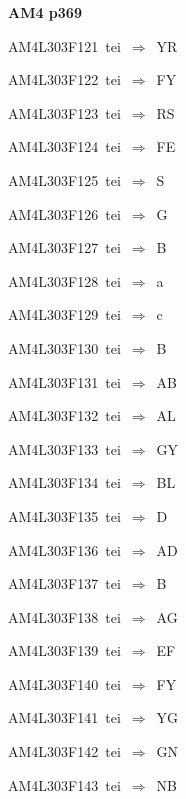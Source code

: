 \par\vfill\eject
{\bf\hfill AM4 p369\hfill\hbox{}}\par\bigskip
{\sixrm AM4L303F121\ {\sixit tei}\ }$\Rightarrow$\ YR\par\smallskip
{\sixrm AM4L303F122\ {\sixit tei}\ }$\Rightarrow$\ FY\par\smallskip
{\sixrm AM4L303F123\ {\sixit tei}\ }$\Rightarrow$\ RS\par\smallskip
{\sixrm AM4L303F124\ {\sixit tei}\ }$\Rightarrow$\ FE\par\smallskip
{\sixrm AM4L303F125\ {\sixit tei}\ }$\Rightarrow$\ S\par\smallskip
{\sixrm AM4L303F126\ {\sixit tei}\ }$\Rightarrow$\ G\par\smallskip
{\sixrm AM4L303F127\ {\sixit tei}\ }$\Rightarrow$\ B\par\smallskip
{\sixrm AM4L303F128\ {\sixit tei}\ }$\Rightarrow$\ {\tenit a}\par\smallskip
{\sixrm AM4L303F129\ {\sixit tei}\ }$\Rightarrow$\ {\tenit c}\par\smallskip
{\sixrm AM4L303F130\ {\sixit tei}\ }$\Rightarrow$\ B\par\smallskip
{\sixrm AM4L303F131\ {\sixit tei}\ }$\Rightarrow$\ AB\par\smallskip
{\sixrm AM4L303F132\ {\sixit tei}\ }$\Rightarrow$\ AL\par\smallskip
{\sixrm AM4L303F133\ {\sixit tei}\ }$\Rightarrow$\ GY\par\smallskip
{\sixrm AM4L303F134\ {\sixit tei}\ }$\Rightarrow$\ BL\par\smallskip
{\sixrm AM4L303F135\ {\sixit tei}\ }$\Rightarrow$\ D\par\smallskip
{\sixrm AM4L303F136\ {\sixit tei}\ }$\Rightarrow$\ AD\par\smallskip
{\sixrm AM4L303F137\ {\sixit tei}\ }$\Rightarrow$\ B\par\smallskip
{\sixrm AM4L303F138\ {\sixit tei}\ }$\Rightarrow$\ AG\par\smallskip
{\sixrm AM4L303F139\ {\sixit tei}\ }$\Rightarrow$\ EF\par\smallskip
{\sixrm AM4L303F140\ {\sixit tei}\ }$\Rightarrow$\ FY\par\smallskip
{\sixrm AM4L303F141\ {\sixit tei}\ }$\Rightarrow$\ YG\par\smallskip
{\sixrm AM4L303F142\ {\sixit tei}\ }$\Rightarrow$\ GN\par\smallskip
{\sixrm AM4L303F143\ {\sixit tei}\ }$\Rightarrow$\ NB\par\smallskip

